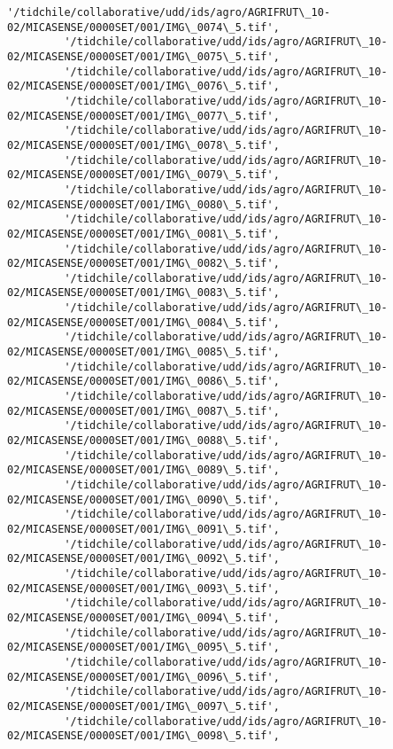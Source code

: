 \documentclass[11pt]{article}
\begin{document}
\begin{Verbatim}[commandchars=\\\{\}]
         '/tidchile/collaborative/udd/ids/agro/AGRIFRUT\_10-02/MICASENSE/0000SET/001/IMG\_0074\_5.tif',
         '/tidchile/collaborative/udd/ids/agro/AGRIFRUT\_10-02/MICASENSE/0000SET/001/IMG\_0075\_5.tif',
         '/tidchile/collaborative/udd/ids/agro/AGRIFRUT\_10-02/MICASENSE/0000SET/001/IMG\_0076\_5.tif',
         '/tidchile/collaborative/udd/ids/agro/AGRIFRUT\_10-02/MICASENSE/0000SET/001/IMG\_0077\_5.tif',
         '/tidchile/collaborative/udd/ids/agro/AGRIFRUT\_10-02/MICASENSE/0000SET/001/IMG\_0078\_5.tif',
         '/tidchile/collaborative/udd/ids/agro/AGRIFRUT\_10-02/MICASENSE/0000SET/001/IMG\_0079\_5.tif',
         '/tidchile/collaborative/udd/ids/agro/AGRIFRUT\_10-02/MICASENSE/0000SET/001/IMG\_0080\_5.tif',
         '/tidchile/collaborative/udd/ids/agro/AGRIFRUT\_10-02/MICASENSE/0000SET/001/IMG\_0081\_5.tif',
         '/tidchile/collaborative/udd/ids/agro/AGRIFRUT\_10-02/MICASENSE/0000SET/001/IMG\_0082\_5.tif',
         '/tidchile/collaborative/udd/ids/agro/AGRIFRUT\_10-02/MICASENSE/0000SET/001/IMG\_0083\_5.tif',
         '/tidchile/collaborative/udd/ids/agro/AGRIFRUT\_10-02/MICASENSE/0000SET/001/IMG\_0084\_5.tif',
         '/tidchile/collaborative/udd/ids/agro/AGRIFRUT\_10-02/MICASENSE/0000SET/001/IMG\_0085\_5.tif',
         '/tidchile/collaborative/udd/ids/agro/AGRIFRUT\_10-02/MICASENSE/0000SET/001/IMG\_0086\_5.tif',
         '/tidchile/collaborative/udd/ids/agro/AGRIFRUT\_10-02/MICASENSE/0000SET/001/IMG\_0087\_5.tif',
         '/tidchile/collaborative/udd/ids/agro/AGRIFRUT\_10-02/MICASENSE/0000SET/001/IMG\_0088\_5.tif',
         '/tidchile/collaborative/udd/ids/agro/AGRIFRUT\_10-02/MICASENSE/0000SET/001/IMG\_0089\_5.tif',
         '/tidchile/collaborative/udd/ids/agro/AGRIFRUT\_10-02/MICASENSE/0000SET/001/IMG\_0090\_5.tif',
         '/tidchile/collaborative/udd/ids/agro/AGRIFRUT\_10-02/MICASENSE/0000SET/001/IMG\_0091\_5.tif',
         '/tidchile/collaborative/udd/ids/agro/AGRIFRUT\_10-02/MICASENSE/0000SET/001/IMG\_0092\_5.tif',
         '/tidchile/collaborative/udd/ids/agro/AGRIFRUT\_10-02/MICASENSE/0000SET/001/IMG\_0093\_5.tif',
         '/tidchile/collaborative/udd/ids/agro/AGRIFRUT\_10-02/MICASENSE/0000SET/001/IMG\_0094\_5.tif',
         '/tidchile/collaborative/udd/ids/agro/AGRIFRUT\_10-02/MICASENSE/0000SET/001/IMG\_0095\_5.tif',
         '/tidchile/collaborative/udd/ids/agro/AGRIFRUT\_10-02/MICASENSE/0000SET/001/IMG\_0096\_5.tif',
         '/tidchile/collaborative/udd/ids/agro/AGRIFRUT\_10-02/MICASENSE/0000SET/001/IMG\_0097\_5.tif',
         '/tidchile/collaborative/udd/ids/agro/AGRIFRUT\_10-02/MICASENSE/0000SET/001/IMG\_0098\_5.tif',

\end{Verbatim}
\end{document}

